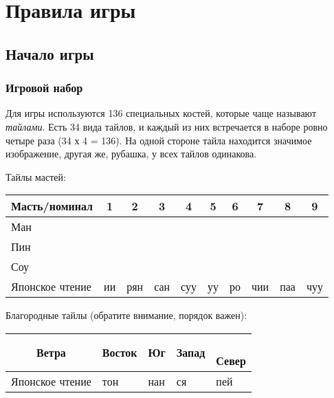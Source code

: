 \section{Правила игры}

\subsection{Начало игры}

\subsubsection{Игровой набор}

Для игры используются 136 специальных костей, которые чаще называют \textit{тайлами}. Есть 34 вида тайлов, и каждый из них встречается в наборе ровно четыре раза (34 х 4 = 136). На одной стороне тайла находится значимое изображение, другая же, рубашка, у всех тайлов одинакова.

Тайлы мастей:

\begin{tabular}{ |C{3.5cm}|c|c|c|c|c|c|c|c|c| } 
	\hline
	Масть/номинал & 1 & 2 & 3 & 4 & 5 & 6 & 7 & 8 & 9 \\
	\hline
	Ман \newline &  &  &  &  &  &  &  &  &  \rule[1ex]{0pt}{7ex} \\
	\hline
	Пин \newline &  &  &  &  &  &  &  &  &  \rule[1ex]{0pt}{7ex} \\
	\hline
	Соу \newline &  &  &  &  &  &  &  &  &  \rule[1ex]{0pt}{7ex} \\
	\hline
	Японское чтение & ии & рян & сан & суу & уу & ро & чии & паа & чуу \rule[1ex]{0pt}{2ex} \\
	\hline 
\end{tabular}


Благородные тайлы (обратите внимание, порядок важен):

\begin{tabular}{ |c|C{2cm}|C{2cm}|C{2cm}|C{2cm}| } 
	\hline
	 \rule[0ex]{0pt}{7ex} Ветра &  \newline Восток &  \newline Юг &  \newline Запад & { \newline Север} \\
	\hline
	Японское чтение & тон & нан & ся & пей \\
	\hline
\end{tabular}

